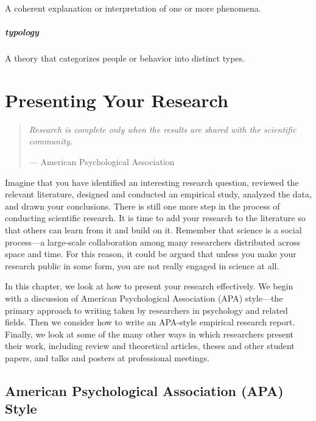 \documentclass[
]{krantz}
\begin{document}
A coherent explanation or interpretation of one or more phenomena.

\paragraph*{typology}\label{typology}

A theory that categorizes people or behavior into distinct types.

\chapter{Presenting Your Research}\label{presenting-your-research}

\begin{quote}
\emph{Research is complete only when the results are shared with the scientific community.}

--- American Psychological Association
\end{quote}

Imagine that you have identified an interesting research question, reviewed the relevant literature, designed and conducted an empirical study, analyzed the data, and drawn your conclusions. There is still one more step in the process of conducting scientific research. It is time to add your research to the literature so that others can learn from it and build on it. Remember that science is a social process---a large-scale collaboration among many researchers distributed across space and time. For this reason, it could be argued that unless you make your research public in some form, you are not really engaged in science at all.

In this chapter, we look at how to present your research effectively. We begin with a discussion of American Psychological Association (APA) style---the primary approach to writing taken by researchers in psychology and related fields. Then we consider how to write an APA-style empirical research report. Finally, we look at some of the many other ways in which researchers present their work, including review and theoretical articles, theses and other student papers, and talks and posters at professional meetings.

\section{American Psychological Association (APA) Style}\label{american-psychological-association-apa-style}
\end{document}
